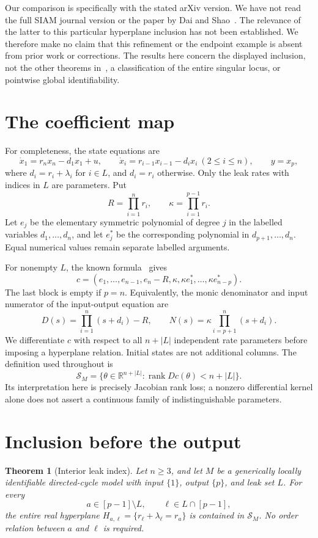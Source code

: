 \documentclass[11pt]{article}
\newtheorem{theorem}{Theorem}
\newcommand{\R}{\mathbb R}
\DeclareMathOperator{\rank}{rank}
\begin{document}
Our comparison is specifically with the stated arXiv version. We have not read the full SIAM journal version or the paper by Dai and Shao~\cite{DS}. The relevance of the latter to this particular hyperplane inclusion has not been established. We therefore make no claim that this refinement or the endpoint example is absent from prior work or corrections. The results here concern the displayed inclusion, not the other theorems in~\cite{Ahmed}, a classification of the entire singular locus, or pointwise global identifiability.

\section{The coefficient map}
For completeness, the state equations are
\[
 \dot x_1=r_nx_n-d_1x_1+u,\qquad
 \dot x_i=r_{i-1}x_{i-1}-d_ix_i\ (2\leq i\leq n),
 \qquad y=x_p,
\]
where \(d_i=r_i+\lambda_i\) for \(i\in L\), and \(d_i=r_i\) otherwise. Only the leak rates with indices in \(L\) are parameters. Put
\[
 R=\prod_{i=1}^n r_i,\qquad
 \kappa=\prod_{i=1}^{p-1}r_i.
\]
Let \(e_j\) be the elementary symmetric polynomial of degree \(j\) in the labelled variables \(d_1,\ldots,d_n\), and let \(e_j^*\) be the corresponding polynomial in \(d_{p+1},\ldots,d_n\). Equal numerical values remain separate labelled arguments.

For nonempty \(L\), the known formula~\cite[Lemma~3.10]{Ahmed} gives
\begin{equation}\label{eq:map}
 c=(e_1,\ldots,e_{n-1},e_n-R,\kappa,
       \kappa e_1^*,\ldots,\kappa e_{n-p}^*).
\end{equation}
The last block is empty if \(p=n\). Equivalently, the monic denominator and input numerator of the input-output equation are
\[
 D(s)=\prod_{i=1}^n(s+d_i)-R,\qquad
 N(s)=\kappa\prod_{i=p+1}^n(s+d_i).
\]
We differentiate \(c\) with respect to all \(n+|L|\) independent rate parameters before imposing a hyperplane relation. Initial states are not additional columns. The definition used throughout is
\[
 \mathcal S_M=\{\theta\in\R^{n+|L|}:
                  \rank Dc(\theta)<n+|L|\}.
\]
Its interpretation here is precisely Jacobian rank loss; a nonzero differential kernel alone does not assert a continuous family of indistinguishable parameters.

\section{Inclusion before the output}
\begin{theorem}[Interior leak index]\label{thm:interior}
Let \(n\geq3\), and let \(M\) be a generically locally identifiable directed-cycle model with input \(\{1\}\), output \(\{p\}\), and leak set \(L\). For every
\[
 a\in[p-1]\setminus L,\qquad \ell\in L\cap[p-1],
\]
the entire real hyperplane \(H_{a,\ell}=\{r_\ell+\lambda_\ell=r_a\}\) is contained in \(\mathcal S_M\). No order relation between \(a\) and \(\ell\) is required.
\end{theorem}
\end{document}
